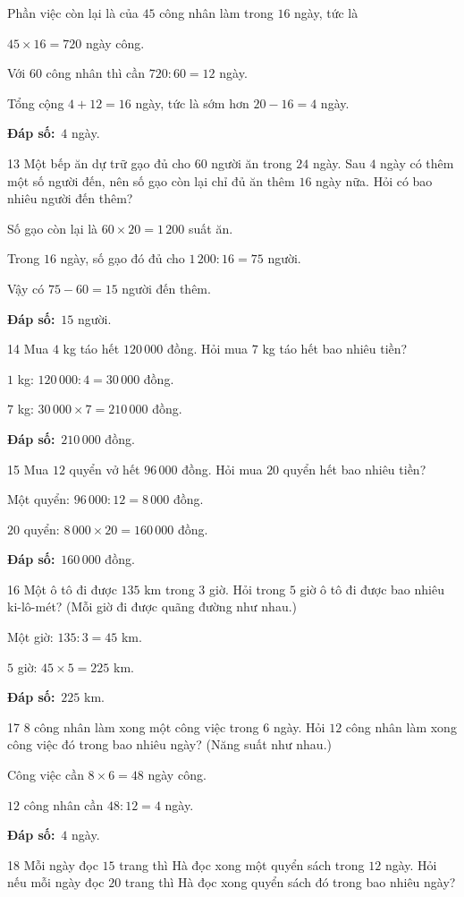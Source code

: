 \documentclass[11pt]{article}
\newif\ifsol \solfalse
\providecommand{\AnsWord}{Đáp số}
\newcommand{\dapso}[1]{\par\textbf{\AnsWord:}\ #1}
\newcommand{\probsol}[1]{%
  \begin{lrbox}{\solmeasure}\begin{minipage}{\dimexpr\linewidth-24pt\relax}#1\end{minipage}\end{lrbox}%
  \ifsol
    \begin{solbox}#1\end{solbox}%
  \else
    \setlength{\solht}{\dimexpr\ht\solmeasure+\dp\solmeasure+0.85cm\relax}%
    \ifdim\solht<1.35cm\setlength{\solht}{1.35cm}\fi
    \begin{tcolorbox}[colback=white,colframe=Line,boxrule=0.8pt,arc=5pt,
      left=8pt,right=8pt,top=4pt,bottom=4pt,height=\solht]{\footnotesize\color{Slate}\itshape\WorkWord}\end{tcolorbox}%
  \fi}
\newcommand{\gap}{\vspace{0.3cm}}
\def\WorkWord{Bài làm:}
\def\AnsWord{Đáp số}
\begin{document}
\probsol{
Phần việc còn lại là của $45$ công nhân làm trong $16$ ngày, tức là\par $45\times16=720$ ngày công.\par Với $60$ công nhân thì cần $720:60=12$ ngày.\par
Tổng cộng $4+12=16$ ngày, tức là sớm hơn $20-16=4$ ngày.
\dapso{$4$ ngày.}}
\gap
\begin{probbox}{13}{\relax}
Một bếp ăn dự trữ gạo đủ cho $60$ người ăn trong $24$ ngày. Sau $4$ ngày có thêm một số người đến, nên số gạo còn lại chỉ đủ ăn thêm $16$ ngày nữa. Hỏi có bao nhiêu người đến thêm?
\end{probbox}
\probsol{
Số gạo còn lại là $60\times20=1\,200$ suất ăn.\par Trong $16$ ngày, số gạo đó đủ cho $1\,200:16=75$ người.\par
Vậy có $75-60=15$ người đến thêm.
\dapso{$15$ người.}}
\gap
\begin{probbox}{14}{\relax}
Mua $4$ kg táo hết $120\,000$ đồng. Hỏi mua $7$ kg táo hết bao nhiêu tiền?
\end{probbox}
\probsol{
$1$ kg: $120\,000:4=30\,000$ đồng.\par $7$ kg: $30\,000\times7=210\,000$ đồng.
\dapso{$210\,000$ đồng.}}
\gap
\begin{probbox}{15}{\relax}
Mua $12$ quyển vở hết $96\,000$ đồng. Hỏi mua $20$ quyển hết bao nhiêu tiền?
\end{probbox}
\probsol{
Một quyển: $96\,000:12=8\,000$ đồng.\par $20$ quyển: $8\,000\times20=160\,000$ đồng.
\dapso{$160\,000$ đồng.}}
\gap
\begin{probbox}{16}{\relax}
Một ô tô đi được $135$ km trong $3$ giờ. Hỏi trong $5$ giờ ô tô đi được bao nhiêu ki-lô-mét? (Mỗi giờ đi được quãng đường như nhau.)
\end{probbox}
\probsol{
Một giờ: $135:3=45$ km.\par $5$ giờ: $45\times5=225$ km.
\dapso{$225$ km.}}
\gap
\begin{probbox}{17}{\relax}
$8$ công nhân làm xong một công việc trong $6$ ngày. Hỏi $12$ công nhân làm xong công việc đó trong bao nhiêu ngày? (Năng suất như nhau.)
\end{probbox}
\probsol{
Công việc cần $8\times6=48$ ngày công.\par $12$ công nhân cần $48:12=4$ ngày.
\dapso{$4$ ngày.}}
\gap
\begin{probbox}{18}{\relax}
Mỗi ngày đọc $15$ trang thì Hà đọc xong một quyển sách trong $12$ ngày. Hỏi nếu mỗi ngày đọc $20$ trang thì Hà đọc xong quyển sách đó trong bao nhiêu ngày?
\end{probbox}
\end{document}
